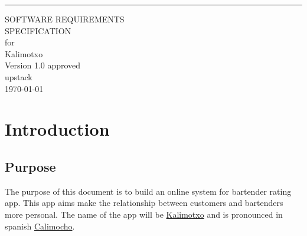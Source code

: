 \documentclass{scrreprt}
\date{}
\def\myversion{1.0 }
\begin{document}
\begin{flushright}
    \rule{16cm}{5pt}\vskip1cm
    \begin{bfseries}
        \Huge{SOFTWARE REQUIREMENTS\\ SPECIFICATION}\\
        \vspace{1.9cm}
        for\\
        \vspace{1.9cm}
        Kalimotxo\\
        \vspace{1.9cm}
        \LARGE{Version \myversion approved}\\
        \vspace{1.9cm}
        upstack\\
        \vspace{1.9cm}
        \today\\
    \end{bfseries}
\end{flushright}

\tableofcontents


%

\chapter{Introduction}

\section{Purpose}
The purpose of this document is to build an online system for bartender rating app.
This app aims make the relationship between customers and bartenders more personal.
The name of the app will be \hyperlink{https://www.supercall.com/recipe/kalimotxo-drink-recipe}{Kalimotxo} and is pronounced in spanish
\hyperlink{https://forvo.com/word/kalimotxo/}{Calimocho}.
\end{document}
